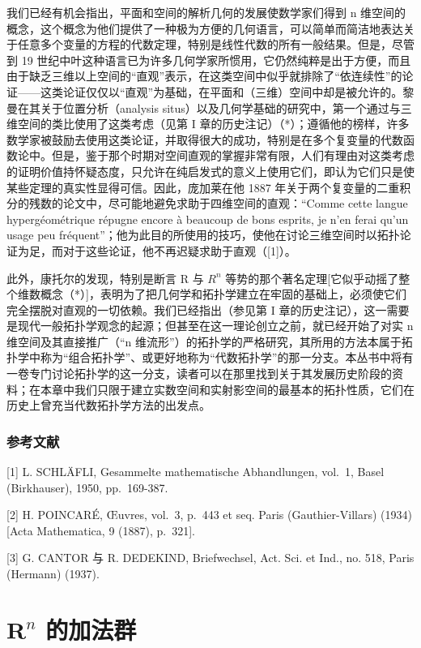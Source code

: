 我们已经有机会指出，平面和空间的解析几何的发展使数学家们得到 n 维空间的概念，这个概念为他们提供了一种极为方便的几何语言，可以简单而简洁地表达关于任意多个变量的方程的代数定理，特别是线性代数的所有一般结果。但是，尽管到 19 世纪中叶这种语言已为许多几何学家所惯用，它仍然纯粹是出于方便，而且由于缺乏三维以上空间的“直观”表示，在这类空间中似乎就排除了“依连续性”的论证——这类论证仅仅以“直观”为基础，在平面和（三维）空间中却是被允许的。黎曼在其关于位置分析（analysis situs）以及几何学基础的研究中，第一个通过与三维空间的类比使用了这类考虑（见第 I 章的历史注记）（*）；遵循他的榜样，许多数学家被鼓励去使用这类论证，并取得很大的成功，特别是在多个复变量的代数函数论中。但是，鉴于那个时期对空间直观的掌握非常有限，人们有理由对这类考虑的证明价值持怀疑态度，只允许在纯启发式的意义上使用它们，即认为它们只是使某些定理的真实性显得可信。因此，庞加莱在他 1887 年关于两个复变量的二重积分的残数的论文中，尽可能地避免求助于四维空间的直观：“Comme cette langue hypergéométrique répugne encore à beaucoup de bons esprits, je n'en ferai qu'un usage peu fréquent”；他为此目的所使用的技巧，使他在讨论三维空间时以拓扑论证为足，而对于这些论证，他不再迟疑求助于直观（{[}1{]}）。

此外，康托尔的发现，特别是断言 R 与 \(R^{n}\) 等势的那个著名定理{[}它似乎动摇了整个维数概念（*）{]}，表明为了把几何学和拓扑学建立在牢固的基础上，必须使它们完全摆脱对直观的一切依赖。我们已经指出（参见第 I 章的历史注记），这一需要是现代一般拓扑学观念的起源；但甚至在这一理论创立之前，就已经开始了对实 n 维空间及其直接推广（“n 维流形”）的拓扑学的严格研究，其所用的方法本属于拓扑学中称为“组合拓扑学”、或更好地称为“代数拓扑学”的那一分支。本丛书中将有一卷专门讨论拓扑学的这一分支，读者可以在那里找到关于其发展历史阶段的资料；在本章中我们只限于建立实数空间和实射影空间的最基本的拓扑性质，它们在历史上曾充当代数拓扑学方法的出发点。

\subsection*{参考文献}

{[}1{]} L. SCHLÄFLI, Gesammelte mathematische Abhandlungen, vol.~1, Basel (Birkhauser), 1950, pp.~169-387.

{[}2{]} H. POINCARÉ, Œuvres, vol.~3, p.~443 et seq. Paris (Gauthier-Villars) (1934) {[}Acta Mathematica, 9 (1887), p.~321{]}.

{[}3{]} G. CANTOR 与 R. DEDEKIND, Briefwechsel, Act. Sci. et Ind., no. 518, Paris (Hermann) (1937).

\chapter{\texorpdfstring{\(\mathbf{R}^n\) 的加法群}{R 的 n 次幂的加法群}}

